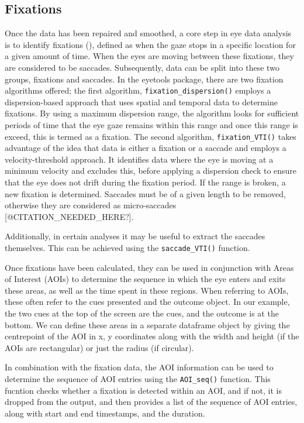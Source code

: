 \documentclass[
  man,
  floatsintext,
  longtable,
  nolmodern,
  notxfonts,
  notimes,
  colorlinks=true,linkcolor=blue,citecolor=blue,urlcolor=blue]{apa7}
\begin{document}
\subsection{Fixations}\label{fixations}

Once the data has been repaired and smoothed, a core step in eye data
analysis is to identify fixations
(),
defined as when the gaze stops in a specific location for a given amount
of time. When the eyes are moving between these fixations, they are
considered to be saccades. Subsequently, data can be split into these
two groups, fixations and saccades. In the eyetools package, there are
two fixation algorithms offered; the first algorithm,
\texttt{fixation\_dispersion()} employs a dispersion-based approach that
uses spatial and temporal data to determine fixations. By using a
maximum dispersion range, the algorithm looks for sufficient periods of
time that the eye gaze remains within this range and once this range is
exceed, this is termed as a fixation. The second algorithm,
\texttt{fixation\_VTI()} takes advantage of the idea that data is either
a fixation or a saccade and employs a velocity-threshold approach. It
identifies data where the eye is moving at a minimum velocity and
excludes this, before applying a dispersion check to ensure that the eye
does not drift during the fixation period. If the range is broken, a new
fixation is determined. Saccades must be of a given length to be
removed, otherwise they are considered as micro-saccades
{[}@CITATION\_NEEDED\_HERE?{]}.

Additionally, in certain analyses it may be useful to extract the
saccades themselves. This can be achieved using the
\texttt{saccade\_VTI()} function.

Once fixations have been calculated, they can be used in conjunction
with Areas of Interest (AOIs) to determine the sequence in which the eye
enters and exits these areas, as well as the time spent in these
regions. When referring to AOIs, these often refer to the cues presented
and the outcome object. In our example, the two cues at the top of the
screen are the cues, and the outcome is at the bottom. We can define
these areas in a separate dataframe object by giving the centrepoint of
the AOI in x, y coordinates along with the width and height (if the AOIs
are rectangular) or just the radius (if circular).

In combination with the fixation data, the AOI information can be used
to determine the sequence of AOI entries using the \texttt{AOI\_seq()}
function. This fucntion checks whether a fixation is detected within an
AOI, and if not, it is dropped from the output, and then provides a list
of the sequence of AOI entries, along with start and end timestamps, and
the duration.
\end{document}
